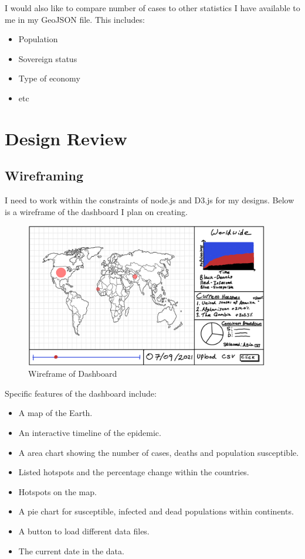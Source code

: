 \documentclass{report}
\begin{document}
I would also like to compare number of cases to other statistics I have available to me in my GeoJSON file. This includes:
\begin{itemize}
    \item Population
    \item Sovereign status
    \item Type of economy
    \item etc
\end{itemize}

\newpage
\chapter{Design Review}
\section{Wireframing}
I need to work within the constraints of node.js and D3.js for my designs. Below is a wireframe of the dashboard I plan on creating.
\begin{center}
    \begin{figure}[h]
        \centering
        \includegraphics[width=0.95\textwidth]{Images/Home_Wireframe.png}
        \caption{Wireframe of Dashboard}
        \label{fig:wireframe_world}
    \end{figure}
\end{center}
Specific features of the dashboard include:
\begin{itemize}
    \item A map of the Earth.
    \item An interactive timeline of the epidemic.
    \item A area chart showing the number of cases, deaths and population susceptible.
    \item Listed hotspots and the percentage change within the countries.
    \item Hotspots on the map.
    \item A pie chart for susceptible, infected and dead populations within continents.
    \item A button to load different data files.
    \item The current date in the data.
\end{itemize}
\end{document}
